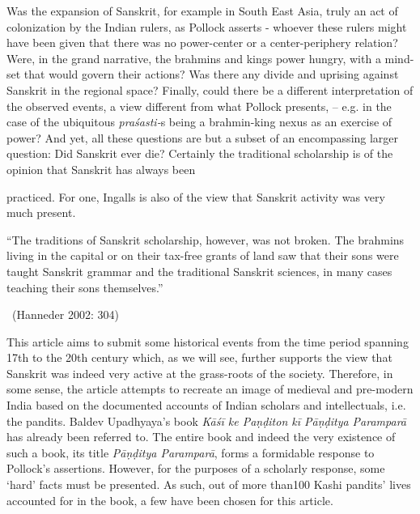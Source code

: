 Was the expansion of Sanskrit, for example in South East Asia, truly an act of colonization by the Indian rulers, as Pollock asserts - whoever these rulers might have been given that there was no power-center or a center-periphery relation? Were, in the grand narrative, the brahmins and kings power hungry, with a mind-set that would govern their actions? Was there any divide and uprising against Sanskrit in the regional space? Finally, could there be a different interpretation of the observed events, a view different from what Pollock presents, – e.g. in the case of the ubiquitous \textit{praśasti-}s being a brahmin-king nexus as an exercise of power? And yet, all these questions are but a subset of an encompassing larger question: Did Sanskrit ever die? Certainly the traditional scholarship is of the opinion that Sanskrit has always \hbox{been}\break

\eject

 practiced. For one, Ingalls is also of the view that Sanskrit activity was very much present.

\begin{myquote}
“The traditions of Sanskrit scholarship, however, was not broken. The brahmins living in the capital or on their tax-free grants of land saw that their sons were taught Sanskrit grammar and the traditional Sanskrit sciences, in many cases teaching their sons themselves.” 

~\hfill (Hanneder 2002: 304)
\end{myquote}

This article aims to submit some historical events from the time period spanning 17th to the 20th century which, as we will see, further supports the view that Sanskrit was indeed very active at the grass-roots of the society. Therefore, in some sense, the article attempts to recreate an image of medieval and pre-modern India based on the documented accounts of Indian scholars and intellectuals, i.e. the pandits. Baldev Upadhyaya’s book \textit{Kāśī ke Paṇḍiton kī Pāṇḍitya Paramparā} has already been referred to. The entire book and indeed the very existence of such a book, its title \textit{Pāṇḍitya Paramparā}, forms a formidable response to Pollock’s assertions. However, for the purposes of a scholarly response, some ‘hard’ facts must be presented. As such, out of more than100 Kashi pandits’ lives accounted for in the book, a few have been chosen for this article.


